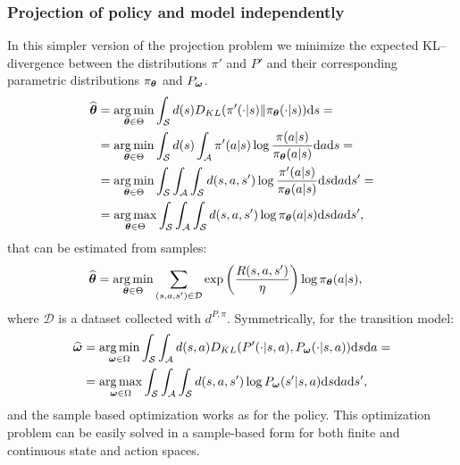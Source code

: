 \subsubsection{Projection of policy and model independently}
\label{sec:disjproj}
In this simpler version of the projection problem we minimize the expected KL--divergence between the distributions $\pi'$ and $P'$ and their corresponding parametric distributions $\pi_{\bm{\mathbf{\theta}}}$ and $P_{\bm{\mathbf{\omega}}}$.
\begin{align}
	\widehat{\bm{\mathbf{\theta}}} & = \operatorname*{arg\,min}_{\bm{\mathbf{\theta}} \in \Theta} \int_{\mathcal{S}} d(s) D_{KL} (\pi'(\cdot|s) \| \pi_{\bm{\mathbf{\theta}}} (\cdot|s)) \mathrm{d}s = \\
    & = \operatorname*{arg\,min}_{\bm{\mathbf{\theta}} \in \Theta} \int_{\mathcal{S}} d(s) \int_{\mathcal{A}} \pi'(a|s) \log \frac{\pi(a|s)}{\pi_{\bm{\mathbf{\theta}}} (a|s)} \mathrm{d}a \mathrm{d}s = \\
    & = \operatorname*{arg\,min}_{\bm{\mathbf{\theta}} \in \Theta} \int_{\mathcal{S}} \int_{\mathcal{A}}  \int_{\mathcal{S}}  d(s,a,s') \log \frac{\pi'(a|s)}{\pi_{\bm{\mathbf{\theta}}} (a|s)} \mathrm{d}s \mathrm{d}a \mathrm{d}s' = \\
    & = \operatorname*{arg\,max}_{\bm{\mathbf{\theta}} \in \Theta} \int_{\mathcal{S}} \int_{\mathcal{A}}  \int_{\mathcal{S}} d(s,a,s') \log \pi_{\bm{\mathbf{\theta}}} (a|s) \mathrm{d}s \mathrm{d}a \mathrm{d}s',
\end{align}
that can be estimated from samples:
\begin{align}
	\widehat{\bm{\mathbf{\theta}}} & = \operatorname*{arg\,min}_{\bm{\mathbf{\theta}} \in \Theta} \sum_{(s,a,s') \in \mathcal{D}} \exp\left(\frac{R(s,a,s')}{\eta} \right) \log \pi_{\bm{\mathbf{\theta}}} (a|s),
\end{align}
where $\mathcal{D}$ is a dataset collected with $d^{P,\pi}$.
Symmetrically, for the transition model:
\begin{align*}
	\widehat{\bm{\mathbf{\omega}}} & = \operatorname*{arg\,min}_{\bm{\mathbf{\omega}} \in \Omega} \int_{\mathcal{S}} \int_{\mathcal{A}} d(s,a) D_{KL} (P'(\cdot|s,a), P_{\bm{\mathbf{\omega}}} (\cdot|s,a)) \mathrm{d}s \mathrm{d}a= \\
    & = \operatorname*{arg\,max}_{\bm{\mathbf{\omega}} \in \Omega} \int_{\mathcal{S}} \int_{\mathcal{A}}  \int_{\mathcal{S}} d(s,a,s') \log P_{\bm{\mathbf{\omega}}} (s'|s,a) \mathrm{d}s \mathrm{d}a \mathrm{d}s',
\end{align*}
and the sample based optimization works as for the policy. This optimization problem can be easily solved in a sample-based form for both finite and continuous state and action spaces.

